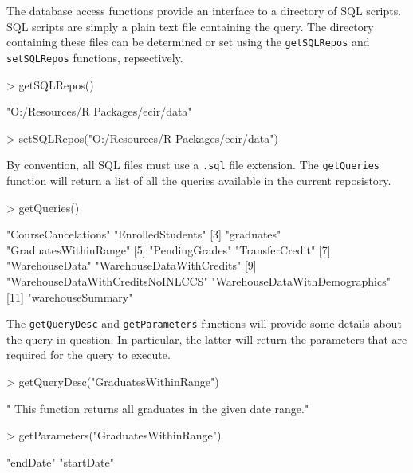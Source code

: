 \documentclass[letterpaper,11pt]{article}
\begin{document}
The database access functions provide an interface to a directory of SQL scripts. SQL scripts are simply a plain text file containing the query. The directory containing these files can be determined or set using the \texttt{getSQLRepos} and \texttt{setSQLRepos} functions, repsectively. 

\begin{Schunk}
\begin{Sinput}
> getSQLRepos()
\end{Sinput}
\begin{Soutput}
[1] "O:/Resources/R Packages/ecir/data"
\end{Soutput}
\end{Schunk}

\begin{Schunk}
\begin{Sinput}
> setSQLRepos("O:/Resources/R Packages/ecir/data")
\end{Sinput}
\end{Schunk}

By convention, all SQL files must use a \texttt{.sql} file extension. The \texttt{getQueries} function will return a list of all the queries available in the current reposistory.

\begin{Schunk}
\begin{Sinput}
> getQueries()
\end{Sinput}
\begin{Soutput}
 [1] "CourseCancelations"               "EnrolledStudents"                
 [3] "graduates"                        "GraduatesWithinRange"            
 [5] "PendingGrades"                    "TransferCredit"                  
 [7] "WarehouseData"                    "WarehouseDataWithCredits"        
 [9] "WarehouseDataWithCreditsNoINLCCS" "WarehouseDataWithDemographics"   
[11] "warehouseSummary"                
\end{Soutput}
\end{Schunk}

The \texttt{getQueryDesc} and \texttt{getParameters} functions will provide some details about the query in question. In particular, the latter will return the parameters that are required for the query to execute.

\begin{Schunk}
\begin{Sinput}
> getQueryDesc("GraduatesWithinRange")
\end{Sinput}
\begin{Soutput}
[1] " This function returns all graduates in the given date range."
\end{Soutput}
\begin{Sinput}
> getParameters("GraduatesWithinRange")
\end{Sinput}
\begin{Soutput}
[1] "endDate"   "startDate"
\end{Soutput}
\end{Schunk}
\end{document}
